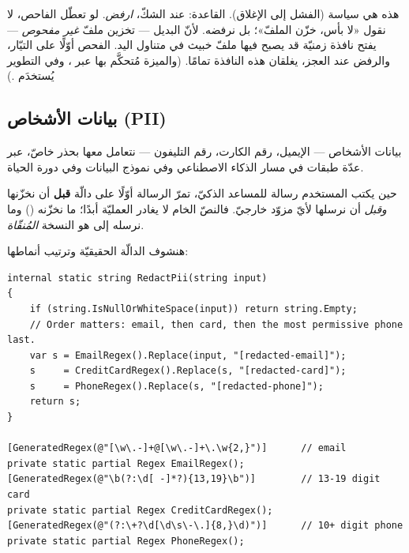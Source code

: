 \begin{secnote}
هذه هي سياسة  (الفشل إلى الإغلاق). القاعدة: عند الشكّ، \emph{ارفض}.
لو تعطّل الفاحص، لا نقول «لا بأس، خزّن الملفّ»؛ بل نرفضه. لأنّ البديل — تخزين ملفّ
\emph{غير مفحوص} — يفتح نافذة زمنيّة قد يصبح فيها ملفّ خبيث في متناول اليد. الفحص
أوّلًا على التيّار، والرفض عند العجز، يغلقان هذه النافذة تمامًا. (والميزة مُتحكَّم بها
عبر ، وفي التطوير يُستخدَم .)
\end{secnote}

\subsection{بيانات الأشخاص (PII)}

بيانات الأشخاص  — الإيميل، رقم الكارت، رقم
التليفون — نتعامل معها بحذر خاصّ، عبر عدّة طبقات في مسار الذكاء الاصطناعي وفي نموذج
البيانات وفي دورة الحياة.

\begin{idea}
حين يكتب المستخدم رسالة للمساعد الذكيّ، تمرّ الرسالة أوّلًا على دالّة
 \textbf{قبل} أن نخزّنها \emph{وقبل} أن نرسلها لأيّ مزوّد خارجيّ.
فالنصّ الخام لا يغادر العمليّة أبدًا؛ ما نخزّنه ()
وما نرسله إلى  هو النسخة \emph{المُنقّاة}.
\end{idea}

هنشوف الدالّة الحقيقيّة وترتيب أنماطها:

\begin{english}
\begin{lstlisting}[language={[Sharp]C}]
internal static string RedactPii(string input)
{
    if (string.IsNullOrWhiteSpace(input)) return string.Empty;
    // Order matters: email, then card, then the most permissive phone last.
    var s = EmailRegex().Replace(input, "[redacted-email]");
    s     = CreditCardRegex().Replace(s, "[redacted-card]");
    s     = PhoneRegex().Replace(s, "[redacted-phone]");
    return s;
}

[GeneratedRegex(@"[\w\.-]+@[\w\.-]+\.\w{2,}")]      // email
private static partial Regex EmailRegex();
[GeneratedRegex(@"\b(?:\d[ -]*?){13,19}\b")]        // 13-19 digit card
private static partial Regex CreditCardRegex();
[GeneratedRegex(@"(?:\+?\d[\d\s\-\.]{8,}\d)")]      // 10+ digit phone
private static partial Regex PhoneRegex();
\end{lstlisting}
\end{english}

